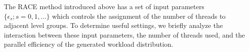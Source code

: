 


The \acrshort{RACE} method introduced above has a set of input parameters $\{\epsilon_s; s=0,1,\ldots\}$ which controls the assignment of the number of threads to adjacent level groups. 
To determine useful settings, we briefly analyze the interaction between these input parameters, the number of threads used, and the parallel efficiency of the generated workload distribution. 

